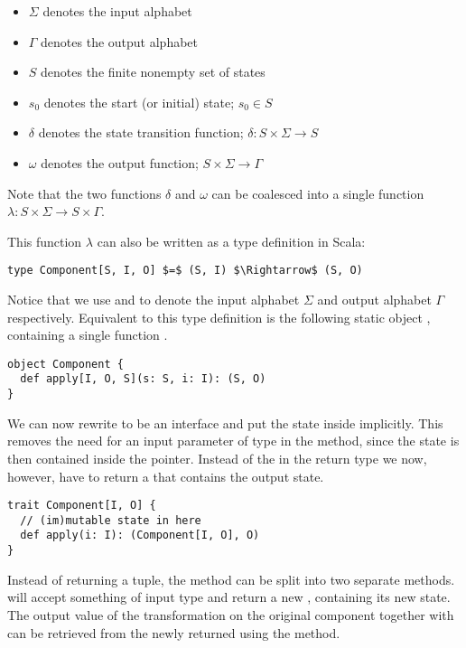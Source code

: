 \begin{itemize}
	\item $\Sigma$ denotes the input alphabet
	\item $\Gamma$ denotes the output alphabet
	\item $S$ denotes the finite nonempty set of states
	\item $s_0$ denotes the start (or initial) state; $s_0 \in S$
	\item $\delta$ denotes the state transition function; $\delta: S \times \Sigma \rightarrow S$
	\item $\omega$ denotes the output function; $S \times \Sigma \rightarrow \Gamma$
\end{itemize}

Note that the two functions $\delta$ and $\omega$ can be coalesced into a single function $\lambda: S \times \Sigma \rightarrow S \times \Gamma$.

This function $\lambda$ can also be written as a type definition in Scala:

\begin{lstlisting}[style=InlineScalaStyle]
type Component[S, I, O] $=$ (S, I) $\Rightarrow$ (S, O)
\end{lstlisting}

Notice that we use  and  to denote the input alphabet $\Sigma$ and output alphabet $\Gamma$ respectively. Equivalent to this type definition is the following static object \comp, containing a single function .

\begin{lstlisting}[style=InlineScalaStyle]
object Component {
  def apply[I, O, S](s: S, i: I): (S, O)
}
\end{lstlisting}

We can now rewrite \comp to be an interface and put the state  inside \comp implicitly. This removes the need for an input parameter of type  in the  method, since the state is then contained inside the  pointer. Instead of the  in the return type we now, however, have to return a \comp that contains the output state.

\begin{lstlisting}[style=InlineScalaStyle]
trait Component[I, O] {
  // (im)mutable state in here
  def apply(i: I): (Component[I, O], O)
}
\end{lstlisting}

Instead of returning a tuple, the  method can be split into two separate methods.  will accept something of input type  and return a new \comp, containing its new state. The output value of the transformation on the original component together with  can be retrieved from the newly returned \comp using the  method.

